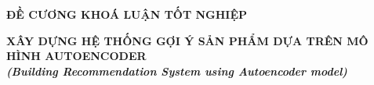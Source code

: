 \documentclass{article}[14pt]
\begin{document}
    \begin{figure}[h]
        \begin{floatrow}
        {%
    
        }
        {%
    
        }
        \end{floatrow}
    \end{figure}
    
    \begin{center}
        
        \textbf{\Large ĐỀ CƯƠNG KHOÁ LUẬN TỐT NGHIỆP} \\ 
    \end{center}
    
    
    \begin{center}
        
        \textbf{\huge  XÂY DỰNG HỆ THỐNG GỢI Ý SẢN PHẨM DỰA TRÊN MÔ HÌNH AUTOENCODER} \\
        
    \vspace{.5cm}
        \textit{\textbf{\Large (Building Recommendation System using Autoencoder model)}}
    \end{center}
    
\end{document}
